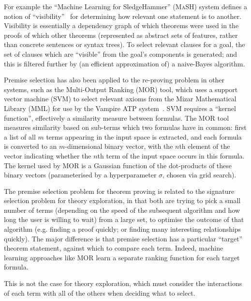 For example the ``Machine Learning for SledgeHammer'' (\textsc{MaSH}) system
defines a notion of ``visibility''~\cite{kuhlwein2013mash} for determining how
relevant one statement is to another. Visibility is essentially a dependency
graph of which theorems were used in the proofs of which other theorems
(represented as abstract sets of features, rather than concrete sentences or
syntax trees). To select relevant clauses for a goal, the set of clauses which
are ``visible'' from the goal's components is generated; and this is filtered
further by (an efficient approximation of) a naive-Bayes algorithm.

Premise selection has also been applied to the re-proving problem in other
systems, such as the Multi-Output Ranking (\textsc{MOR}) tool, which uses a
support vector machine (SVM) to select relevant axioms from the Mizar
Mathematical Library (MML) for use by the Vampire ATP
system~\cite{alama2014premise}. SVM requires a ``kernel function'', effectively
a similarity measure between formulas. The \textsc{MOR} tool measures similarity
based on sub-terms which two formulas have in common: first a list of all $m$
terms appearing in the input space is extracted, and each formula is converted
to an $m$-dimensional binary vector, with the $n$th element of the vector
indicating whether the $n$th term of the input space occurs in this formula. The
kernel used by \textsc{MOR} is a Gaussian function of the dot-products of
these binary vectors (parameterised by a hyperparameter $\sigma$, chosen via
grid search).

The premise selection problem for theorem proving is related to the signature
selection problem for theory exploration, in that both are trying to pick a
small number of terms (depending on the speed of the subsequent algorithm and
how long the user is willing to wait) from a large set, to optimise the outcome
of that algorithm (e.g. finding a proof quickly; or finding many interesting
relationships quickly). The major difference is that premise selection has a
particular ``target'' theorem statement, against which to compare each
term. Indeed, machine learning approaches like \textsc{MOR} learn a separate
ranking function for each target formula.

This is not the case for theory exploration, which must consider the
interactions of each term with all of the others when deciding what to select.

